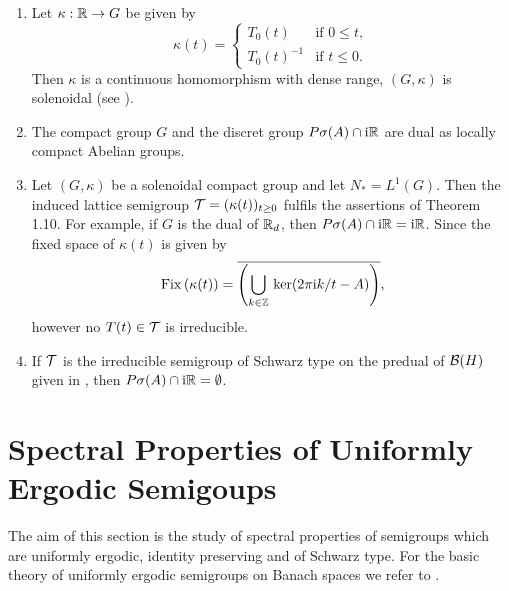 \begin{remark}\label{rem:d3-1.14}
\begin{enumerate}[\upshape (i), wide, labelindent=.25em]
\item Let $\kappa:\mathbb{R} \to G$ be given by
\[
\kappa(t) = \begin{cases}
T_{0}(t) & \text{if } 0 \leq t , \\
T_{0}(t)^{-1} & \text{if } t \leq 0.
\end{cases}
\]
Then $\kappa$ is a continuous homomorphism with dense range, \ie $(G,\kappa)$ is solenoidal (see \textcite{hewittross:1963}).

\item 
The compact group $G$ and the discret group $P\sigma(A) \cap \mathrm{i}\mathbb{R}$ are dual as locally compact Abelian groups.

\item 
Let $(G,\kappa)$ be a solenoidal compact group and let $N_{*} = L^{1}(G)$.
Then the induced lattice semigroup $\TT = (\kappa(t))_{t \geq 0}$ fulfils the assertions of Theorem 1.10.
For example, if\/ $G$ is the dual of\/ $\mathbb{R}_{d}$, then $P\sigma(A) \cap \mathrm{i}\mathbb{R} = \mathrm{i}\mathbb{R}$.
Since the fixed space of\/ $\kappa(t)$ is given by
\[
	\mathop{}\mathrm{Fix}\left(\kappa(t)\right) = 
    \overline{ \left(\bigcup_{k \in \mathbb{Z}} \mathop{}\mathrm{ker}(2\pi \mathrm{i} k /t - A) \right) } ,
\]
however no $T(t) \in \mathcal{T}$ is irreducible.

\item 
If\/ $\mathcal{T}$ is the irreducible semigroup of Schwarz type on the predual of\/ $\mathcal{B}(H)$ given in \textcite{evans:1977}, then $P\sigma(A) \cap \mathrm{i}\mathbb{R} = \emptyset$.
\end{enumerate}
\end{remark}
\section{Spectral Properties of Uniformly Ergodic Semigoups}\label{sec:d3-2}
The aim of this section is the study of spectral properties of semigroups which are uniformly ergodic, identity preserving and of Schwarz type.
For the basic theory of uniformly ergodic semigroups on Banach spaces we refer to \textcite{dunfordschwartz:1958}.

